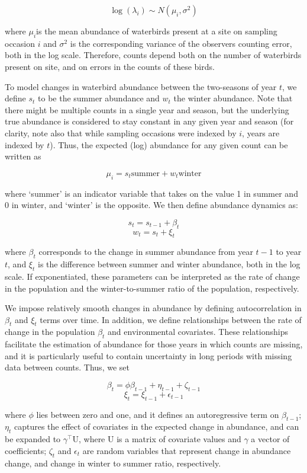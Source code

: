 \documentclass[utf8]{frontiersSCNS}
\begin{document}
\[\log{(\lambda_i)} \sim N(\mu_i, \sigma^2)\]

where \(\mu_i\)is the mean abundance of waterbirds present at a site on
sampling occasion \(i\) and \(\sigma^2\) is the corresponding variance
of the observers counting error, both in the log scale. Therefore,
counts depend both on the number of waterbirds present on site, and on
errors in the counts of these birds.

To model changes in waterbird abundance between the two-seasons of year
\(t\), we define \(s_t\) to be the summer abundance and \(w_t\) the
winter abundance. Note that there might be multiple counts in a single
year and season, but the underlying true abundance is considered to stay
constant in any given year and season (for clarity, note also that while
sampling occasions were indexed by \(i\), years are indexed by \(t\)).
Thus, the expected (log) abundance for any given count can be written as

\[\mu_{i} = s_t \textrm{summer} + w_t \textrm{winter}\]

where `summer' is an indicator variable that takes on the value 1 in
summer and 0 in winter, and `winter' is the opposite. We then define
abundance dynamics as:

\[s_t = s_{t-1} + \beta_t\] \[w_t = s_t + \xi_t\]

where \(\beta_t\) corresponds to the change in summer abundance from
year \(t-1\) to year \(t\), and \(\xi_t\) is the difference between
summer and winter abundance, both in the log scale. If exponentiated,
these parameters can be interpreted as the rate of change in the
population and the winter-to-summer ratio of the population,
respectively.

We impose relatively smooth changes in abundance by defining
autocorrelation in \(\beta_t\) and \(\xi_t\) terms over time. In
addition, we define relationships between the rate of change in the
population \(\beta_t\) and environmental covariates. These relationships
facilitate the estimation of abundance for those years in which counts
are missing, and it is particularly useful to contain uncertainty in
long periods with missing data between counts. Thus, we set

\[\beta_{t} = \phi\beta_{t-1} + \eta_{t-1} + \zeta_{t-1}\]
\[\xi_{t} = \xi_{t-1} + \epsilon_{t-1}\]

where \(\phi\) lies between zero and one, and it defines an
autoregressive term on \(\beta_{t-1}\); \(\eta_t\) captures the effect
of covariates in the expected change in abundance, and can be expanded
to \(\gamma^{\intercal}\mathrm{U}\), where \(\mathrm{U}\) is a matrix of
covariate values and \(\gamma\) a vector of coefficients; \(\zeta_t\)
and \(\epsilon_t\) are random variables that represent change in
abundance change, and change in winter to summer ratio, respectively.
\end{document}
